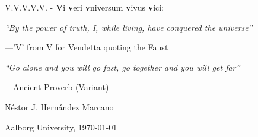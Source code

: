 \vfill
\hfill V.V.V.V.V. - \textbf{V}i \textbf{v}eri \textbf{v}niversum \textbf{v}ivus \textbf{v}ici:

\hfill \textit{``By the power of truth, I, while living, have conquered the universe''}

\hfill ---'V' from V for Vendetta quoting the Faust

\hfill \textit{``Go alone and you will go fast, go together and you will get far''}

\hfill ---Ancient Proverb (Variant)


\vfill
\hfill N\'estor J. Hern\'andez Marcano

\hfill Aalborg University, \today